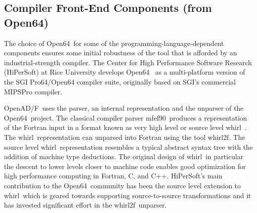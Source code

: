 \documentclass{book}
\newcommand{\mfefninety}{mfef90}
\newcommand{\OpenADF}{OpenAD/F}
\newcommand{\OpenSixtyFour}{Open64}
\newcommand{\whirl}{whirl}
\newcommand{\whirlTof}{whirl2f}
\begin{document}
\subsection{Compiler Front-End Components (from \OpenSixtyFour)} \label{sec:mfef}

The choice of \OpenSixtyFour\ for some of the programming-language-dependent 
components ensures some initial robustness of the tool that is afforded by an 
industrial-strength compiler. 
The Center for High Performance Software Research (HiPerSoft) at Rice University 
develops \OpenSixtyFour\ \cite{open64Web} as a 
multi-platform version of the SGI Pro64/Open64 compiler
suite, originally based on SGI's commercial MIPSPro compiler.

\OpenADF\ uses the parser, an internal representation and the unparser 
of the \OpenSixtyFour\ project.
The classical compiler parser \mfefninety\ produces a representation of the Fortran 
input in a format known as very high level or source level \whirl\ . 
The \whirl\ representation can unparsed into Fortran using the 
tool \whirlTof.
The source level \whirl\
representation resembles a typical abstract syntax tree with the 
addition of machine type deductions. 
The original design of \whirl\ in particular the descent to 
lower levels closer to machine code  enables good optimization 
for high performance
computing in Fortran, C, and C++. HiPerSoft's main
contribution to the \OpenSixtyFour\ community has been the source 
level extension to \whirl\
which is geared towards supporting source-to-source transformations and 
it 
has invested significant effort in the \whirlTof\ unparser.
\end{document}

